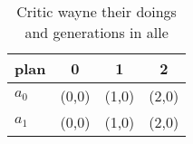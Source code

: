 \documentclass[a4paper]{article}
\begin{document}
\begin{table}
\begin{adjustbox}{width=0.5\columnwidth}
\begin{tabular}{|l|l|l|l|}
\hline
\textbf{plan} & \multicolumn{1}{c|}{\textbf{0}} & \multicolumn{1}{c|}{\textbf{1}} & \multicolumn{1}{c|}{\textbf{2}} \\ \hline
\textbf{$a_0$}  & (0,0) & (1,0) & (2,0) \\ \hline
\textbf{$a_1$}  & (0,0) & (1,0) & (2,0) \\ \hline
\end{tabular}
\end{adjustbox}
\caption{Critic wayne their doings and generations in alle
}
\end{table}
\end{document}
